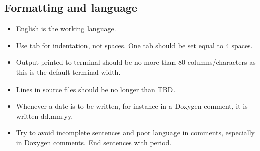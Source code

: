 \documentclass[10pt,a4paper]{article}
\begin{document}
\subsection{Formatting and language}

\begin{itemize}
	\item English is the working language.
	\item Use tab for indentation, not spaces. One tab should be set equal to 4 spaces.
	\item Output printed to terminal should be no more than 80 columns/characters as this is the default terminal width.
	\item Lines in source files should be no longer than TBD.
	\item Whenever a date is to be written, for instance in a Doxygen comment, it is written dd.mm.yy.
	\item Try to avoid incomplete sentences and poor language in comments, especially in Doxygen comments. End sentences with period.
\end{itemize}
\end{document}
